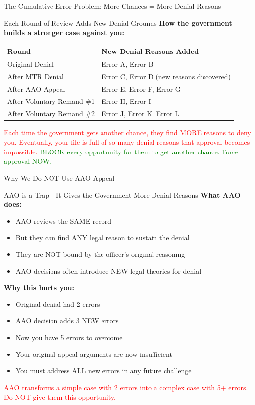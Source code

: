 \documentclass[11pt]{beamer}
\begin{document}
	\begin{frame}{The Cumulative Error Problem: More Chances = More Denial Reasons}
		\scriptsize
		\begin{block}{Each Round of Review Adds New Denial Grounds}
			\textbf{How the government builds a stronger case against you:}
			\vspace{0.2cm}
			\begin{tabular}{|p{4cm}|p{5cm}|}
				\hline
				\textbf{Round} & \textbf{New Denial Reasons Added} \\
				\hline
				Original Denial & Error A, Error B \\
				\hline
				After MTR Denial & Error C, Error D (new reasons discovered) \\
				\hline
				After AAO Appeal & Error E, Error F, Error G \\
				\hline
				After Voluntary Remand \#1 & Error H, Error I \\
				\hline
				After Voluntary Remand \#2 & Error J, Error K, Error L \\
				\hline
			\end{tabular}
			\vspace{0.2cm}
			\textcolor{red}{Each time the government gets another chance, they find MORE reasons to deny you.}
			\textcolor{red}{Eventually, your file is full of so many denial reasons that approval becomes impossible.}
			\textcolor{green}{BLOCK every opportunity for them to get another chance. Force approval NOW.}
		\end{block}
	\end{frame}
	
	\begin{frame}{Why We Do NOT Use AAO Appeal}
		\scriptsize
		\begin{block}{AAO is a Trap - It Gives the Government More Denial Reasons}
			\textbf{What AAO does:}
			\begin{itemize}
				\item AAO reviews the SAME record
				\item But they can find ANY legal reason to sustain the denial
				\item They are NOT bound by the officer's original reasoning
				\item AAO decisions often introduce NEW legal theories for denial
			\end{itemize}
			\textbf{Why this hurts you:}
			\begin{itemize}
				\item Original denial had 2 errors
				\item AAO decision adds 3 NEW errors
				\item Now you have 5 errors to overcome
				\item Your original appeal arguments are now insufficient
				\item You must address ALL new errors in any future challenge
			\end{itemize}
			\textcolor{red}{AAO transforms a simple case with 2 errors into a complex case with 5+ errors.}
			\textcolor{red}{Do NOT give them this opportunity.}
		\end{block}
	\end{frame}
	
\end{document}
